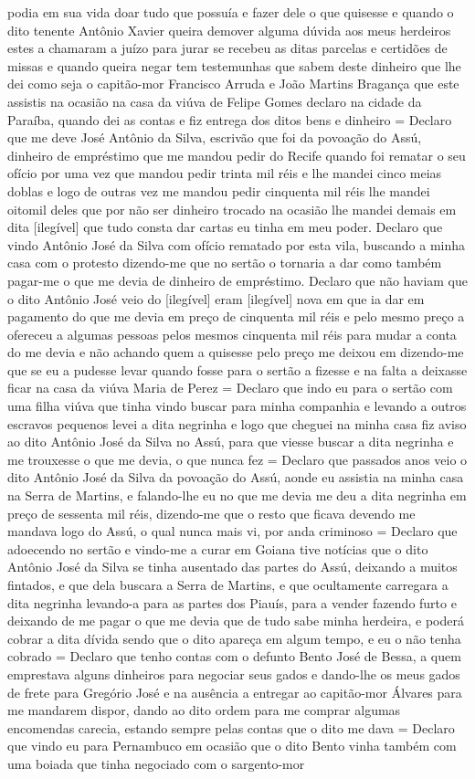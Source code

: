 \begin{refsection}
podia em sua vida doar tudo que possuía e fazer dele o que quisesse e quando o dito tenente Antônio Xavier queira demover alguma dúvida aos meus herdeiros estes a chamaram a juízo para jurar se recebeu as ditas parcelas e certidões de missas e quando queira negar tem testemunhas que sabem deste dinheiro que lhe dei como seja o capitão-mor Francisco Arruda e João Martins Bragança que este assistis na ocasião na casa da viúva de Felipe Gomes declaro na cidade da Paraíba, quando dei as contas e fiz entrega dos ditos bens e dinheiro = Declaro que me deve José Antônio da Silva, escrivão que foi da povoação do Assú, dinheiro de empréstimo que me mandou pedir do Recife quando foi rematar o seu ofício por uma vez que mandou pedir trinta mil réis e lhe mandei cinco meias doblas e logo de outras vez me mandou pedir cinquenta mil réis lhe mandei oitomil deles que por não ser dinheiro trocado na ocasião lhe mandei demais em dita [ilegível] que tudo consta dar cartas eu tinha em meu poder. Declaro que vindo Antônio José da Silva com ofício rematado por esta vila, buscando a minha casa com o protesto dizendo-me que no sertão o tornaria a dar como também pagar-me o que me devia de dinheiro de empréstimo. Declaro que não haviam que o dito Antônio José veio do [ilegível]  eram [ilegível] nova em que ia dar em pagamento do que me devia em preço de cinquenta mil réis e pelo mesmo preço a ofereceu a algumas pessoas pelos mesmos cinquenta mil réis para mudar a conta do me devia e não achando quem a quisesse pelo preço me deixou em dizendo-me que se eu a pudesse levar quando fosse para o sertão a fizesse e na falta a deixasse ficar na casa da viúva Maria de Perez = Declaro que indo eu para o sertão com uma filha viúva que tinha vindo buscar para minha companhia e levando a outros escravos pequenos levei a dita negrinha e logo que cheguei na minha casa fiz aviso ao dito Antônio José da Silva no Assú, para que viesse buscar a dita negrinha e me trouxesse o que me devia, o que nunca fez = Declaro que passados anos veio o dito Antônio José da Silva da povoação do Assú, aonde eu assistia na minha casa na Serra de Martins, e falando-lhe eu no que me devia me deu a dita negrinha em preço de sessenta mil réis, dizendo-me que o resto que ficava devendo me mandava logo do Assú, o qual nunca mais vi, por anda criminoso = Declaro que adoecendo no sertão e vindo-me a curar em Goiana tive notícias que o dito Antônio José da Silva se tinha ausentado das partes do Assú, deixando a muitos fintados, e que dela buscara a Serra de Martins, e que ocultamente carregara a dita negrinha levando-a para as partes dos Piauís, para a vender fazendo furto e deixando de me pagar o que me devia que de tudo sabe minha herdeira, e poderá cobrar a dita dívida sendo que o dito apareça em algum tempo, e eu o não tenha cobrado = Declaro que tenho contas com o defunto Bento José de Bessa, a quem emprestava alguns dinheiros para negociar seus gados e dando-lhe os meus gados de frete para Gregório José e na ausência a entregar ao capitão-mor Álvares para me mandarem dispor, dando ao dito ordem para me comprar algumas encomendas carecia, estando sempre pelas contas que o dito me dava = Declaro que vindo eu para Pernambuco em ocasião que o dito Bento vinha também com uma boiada que tinha negociado com o sargento-mor 
\end{refsection}
